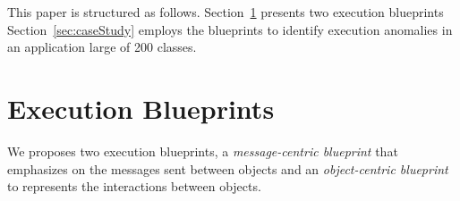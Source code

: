 \documentclass{sig-alternate}
\newcommand{\ab}[1]{\nb{Alexandre}{blue}{#1}}
\newcommand{\seclabel}[1]{\label{sec:#1}}
\newcommand{\secref}[1]{Section~\ref{sec:#1}}
\begin{document}
This paper is structured as follows. 
\secref{executionBlueprints} presents two execution blueprints
\secref{caseStudy} employs the blueprints to identify execution anomalies in an application large of 200 classes.


%
%
%
%

\section{Execution Blueprints} \seclabel{executionBlueprints}

%
%
%

We proposes two execution blueprints, a \emph{message-centric blueprint} that emphasizes on the messages sent between objects and an \emph{object-centric blueprint} to represents the interactions between objects.
\end{document}
